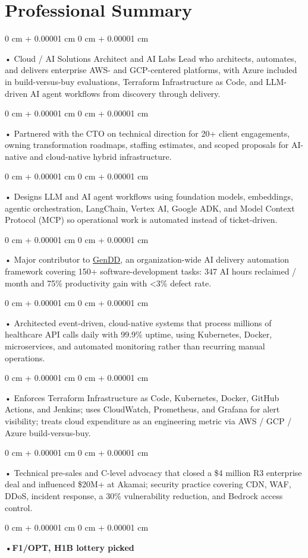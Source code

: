 \documentclass[10pt, letterpaper]{article}
\newenvironment{onecolentry}{
    \begin{adjustwidth}{
        0 cm + 0.00001 cm
    }{
        0 cm + 0.00001 cm
    }
}{
    \end{adjustwidth}
} %
\begin{document}
    \section{Professional Summary}
        \vspace{2 pt }
        \begin{onecolentry}
            • Cloud / AI Solutions Architect and AI Labs Lead who architects, automates, and delivers enterprise AWS- and GCP-centered platforms, with Azure included in build-versus-buy evaluations, Terraform Infrastructure as Code, and LLM-driven AI agent workflows from discovery through delivery.
        \end{onecolentry}
        \begin{onecolentry}
            • Partnered with the CTO on technical direction for 20+ client engagements, owning transformation roadmaps, staffing estimates, and scoped proposals for AI-native and cloud-native hybrid infrastructure.
        \end{onecolentry}
        \begin{onecolentry}
            • Designs LLM and AI agent workflows using foundation models, embeddings, agentic orchestration, LangChain, Vertex AI, Google ADK, and Model Context Protocol (MCP) so operational work is automated instead of ticket-driven.
        \end{onecolentry}
        \begin{onecolentry}
            • Major contributor to \href{https://hatchworks.com/generative-driven-development/}{GenDD}, an organization-wide AI delivery automation framework covering 150+ software-development tasks: 347 AI hours reclaimed / month and 75\% productivity gain with {<}3\% defect rate.
        \end{onecolentry}
        \begin{onecolentry}
            • Architected event-driven, cloud-native systems that process millions of healthcare API calls daily with 99.9\% uptime, using Kubernetes, Docker, microservices, and automated monitoring rather than recurring manual operations.
        \end{onecolentry}
        \begin{onecolentry}
            • Enforces Terraform Infrastructure as Code, Kubernetes, Docker, GitHub Actions, and Jenkins; uses CloudWatch, Prometheus, and Grafana for alert visibility; treats cloud expenditure as an engineering metric via AWS / GCP / Azure build-versus-buy.
        \end{onecolentry}
        \begin{onecolentry}
            • Technical pre-sales and C-level advocacy that closed a \$4 million R3 enterprise deal and influenced \$20M+ at Akamai; security practice covering CDN, WAF, DDoS, incident response, a 30\% vulnerability reduction, and Bedrock access control.
        \end{onecolentry}
        \begin{onecolentry}
                \textbf{•F1/OPT, H1B lottery picked}
        \end{onecolentry}
\end{document}
